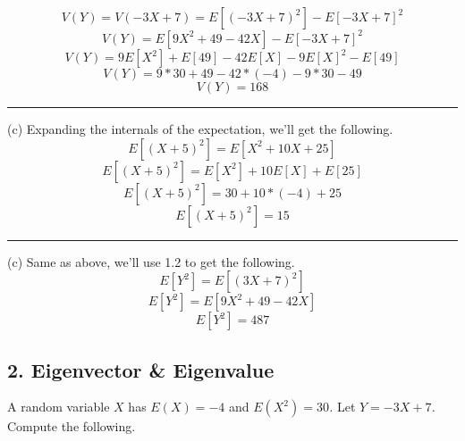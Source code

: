 \documentclass[12pt]{article}
\numberwithin{equation}{section}
\numberwithin{table}{section}
\numberwithin{figure}{section}
\begin{document}
$$
	V(Y) = V(-3X + 7) = E[(-3X + 7)^2] - E[-3X + 7]^2
$$
$$
	V(Y) = E[9X^2 + 49 -42X] - E[-3X + 7]^2
$$
$$
	V(Y) = 9E[X^2] + E[49] - 42E[X] - 9E[X]^2 - E[49]	
$$
$$
	V(Y) = 9*30 + 49 - 42*(-4) - 9*30 - 49
$$
$$
	V(Y) = 168
$$
\noindent\rule{\textwidth}{.5pt}
(c) Expanding the internals of the expectation, we'll get the following.
$$
	E[(X+5)^2] = E[X^2 + 10X + 25]
$$
$$
	E[(X+5)^2] = E[X^2] + 10E[X] + E[25]
$$
$$
	E[(X+5)^2] = 30 + 10*(-4) + 25
$$
$$
	E[(X+5)^2] = 15
$$
\noindent\rule{\textwidth}{.5pt}
(c) Same as above, we'll use 1.2 to get the following.\\
$$
	E[Y^2] = E[(3X + 7)^2]
$$
$$
	E[Y^2] = E[9X^2 + 49 - 42X]
$$
$$
	E[Y^2] = 487
$$

\subsection{2. Eigenvector \& Eigenvalue}

A random variable \textit{$X$} has \textit{$E(X) = -4$} and \textit{$E(X^2) = 30$.} Let \textit{$Y = -3X + 7$.} Compute the following.
\end{document}
